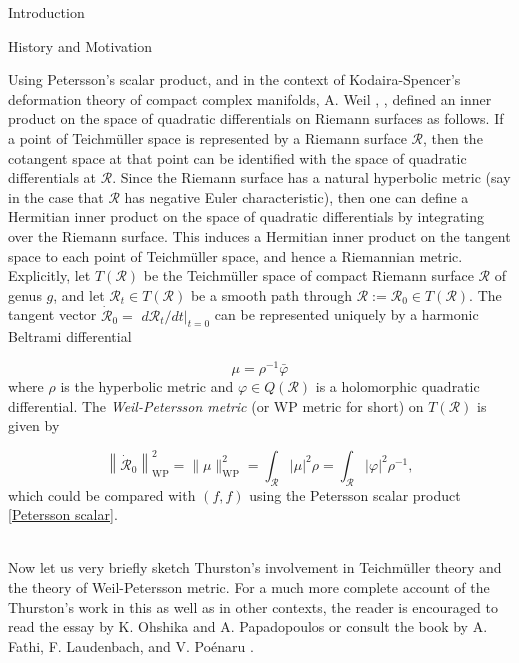 \documentclass[12pt]{amsart}
\theoremstyle{plain}
\theoremstyle{definition}
\theoremstyle{remark}
\numberwithin{equation}{section} %
\numberwithin{figure}{section} %
\begin{document}
\begin{section}{Introduction}
\begin{subsection}{History and Motivation}
{         Using Petersson's scalar product, and in the context of Kodaira-Spencer's deformation theory of compact complex manifolds, A. Weil \cite{Weil1}, \cite{Weil2}, defined an inner product on the space of quadratic differentials on Riemann surfaces as follows. If a point of Teichmüller space is represented by a Riemann surface $\mathscr{R}$, then the cotangent space at that point can be identified with the space of quadratic differentials at $\mathscr{R}$. Since the Riemann surface has a natural hyperbolic metric (say in the case that $\mathscr{R}$ has negative Euler characteristic), then one can define a Hermitian inner product on the space of quadratic differentials by integrating over the Riemann surface. This induces a Hermitian inner product on the tangent space to each point of Teichmüller space, and hence a Riemannian metric.\\
         Explicitly, let
         \(T(\mathscr{R})\) be the Teichmüller space of compact Riemann surface $\mathscr{R}$ of genus \(g\), and let
$\mathscr{R}_{t} \in T(\mathscr{R})$ be a smooth path through \(\mathscr{R}:=\mathscr{R}_{0} \in T(\mathscr{R}) .\) The tangent vector \(\dot{\mathscr{R}}_{0}=\)
\(d \mathscr{R}_{t} /\left.d t\right|_{t=0}\) can be represented uniquely by a harmonic Beltrami differential

\begin{equation}
\mu=\rho^{-1} \bar{\varphi}
\end{equation}
where \(\rho\) is the hyperbolic metric and \(\varphi \in Q(\mathscr{R})\) is a holomorphic quadratic
differential. The {\it Weil-Petersson metric} (or WP metric for short) on \(T(\mathscr{R})\) is given by

\begin{equation}
\left\|\dot{\mathscr{R}}_{0}\right\|_{\mathrm{WP}}^{2}=\|\mu\|_{\mathrm{WP}}^{2}=\int_{\mathscr{R}} |\mu|^{2} \rho=\int_{\mathscr{R}} |\varphi|^{2} \rho^{-1},
\end{equation}
which could be compared with $(f,f)$ using the Petersson scalar product \eqref{Petersson scalar}.}\\

Now let us very briefly sketch Thurston's involvement in Teichm\"uller theory and the theory of Weil-Petersson metric. For a much more complete account of the Thurston's work in this as well as in other contexts, the reader is encouraged to read the essay by K. Ohshika and A. Papadopoulos \cite{Ohshikapapa} or consult the book by A. Fathi, F. Laudenbach, and V. Po\'enaru \cite{Fathi et al}.\\


\end{subsection}
\end{section}
\end{document}

